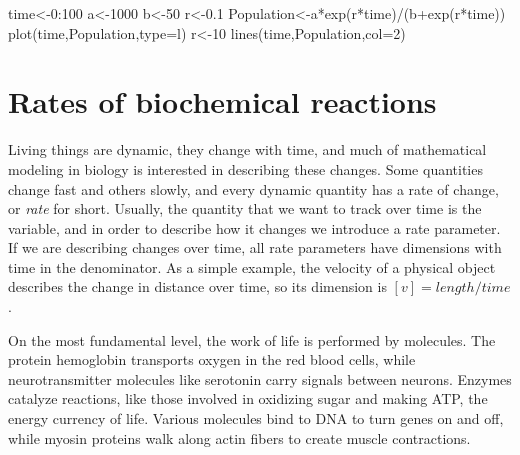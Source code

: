 \documentclass[
  letterpaper,
  DIV=11,
  numbers=noendperiod]{scrreprt}
\newenvironment{Shaded}{\begin{snugshade}}{\end{snugshade}}
\newcommand{\AttributeTok}[1]{\textcolor[rgb]{0.40,0.45,0.13}{#1}}
\newcommand{\DecValTok}[1]{\textcolor[rgb]{0.68,0.00,0.00}{#1}}
\newcommand{\FloatTok}[1]{\textcolor[rgb]{0.68,0.00,0.00}{#1}}
\newcommand{\FunctionTok}[1]{\textcolor[rgb]{0.28,0.35,0.67}{#1}}
\newcommand{\NormalTok}[1]{\textcolor[rgb]{0.00,0.23,0.31}{#1}}
\newcommand{\OtherTok}[1]{\textcolor[rgb]{0.00,0.23,0.31}{#1}}
\newcommand{\SpecialCharTok}[1]{\textcolor[rgb]{0.37,0.37,0.37}{#1}}
\newcommand{\StringTok}[1]{\textcolor[rgb]{0.13,0.47,0.30}{#1}}
\begin{document}
\begin{Shaded}
\begin{Highlighting}[]
\NormalTok{time}\OtherTok{\textless{}{-}}\DecValTok{0}\SpecialCharTok{:}\DecValTok{100}
\NormalTok{a}\OtherTok{\textless{}{-}}\DecValTok{1000}
\NormalTok{b}\OtherTok{\textless{}{-}}\DecValTok{50} 
\NormalTok{r}\OtherTok{\textless{}{-}}\FloatTok{0.1}
\NormalTok{Population}\OtherTok{\textless{}{-}}\NormalTok{a}\SpecialCharTok{*}\FunctionTok{exp}\NormalTok{(r}\SpecialCharTok{*}\NormalTok{time)}\SpecialCharTok{/}\NormalTok{(b}\SpecialCharTok{+}\FunctionTok{exp}\NormalTok{(r}\SpecialCharTok{*}\NormalTok{time)) }
\FunctionTok{plot}\NormalTok{(time,Population,}\AttributeTok{type=}\StringTok{\textquotesingle{}l\textquotesingle{}}\NormalTok{) }
\NormalTok{r}\OtherTok{\textless{}{-}}\DecValTok{10} 
\FunctionTok{lines}\NormalTok{(time,Population,}\AttributeTok{col=}\DecValTok{2}\NormalTok{)}
\end{Highlighting}
\end{Shaded}

\hypertarget{rates-of-biochemical-reactions}{%
\section{Rates of biochemical
reactions}\label{rates-of-biochemical-reactions}}

\label{sec:bio2}

Living things are dynamic, they change with time, and much of
mathematical modeling in biology is interested in describing these
changes. Some quantities change fast and others slowly, and every
dynamic quantity has a rate of change, or \emph{rate} for short.
Usually, the quantity that we want to track over time is the variable,
and in order to describe how it changes we introduce a rate parameter.
If we are describing changes over time, all rate parameters have
dimensions with time in the denominator. As a simple example, the
velocity of a physical object describes the change in distance over
time, so its dimension is \([v] = length/time\).

On the most fundamental level, the work of life is performed by
molecules. The protein hemoglobin transports oxygen in the red blood
cells, while neurotransmitter molecules like serotonin carry signals
between neurons. Enzymes catalyze reactions, like those involved in
oxidizing sugar and making ATP, the energy currency of life. Various
molecules bind to DNA to turn genes on and off, while myosin proteins
walk along actin fibers to create muscle contractions.
\end{document}
